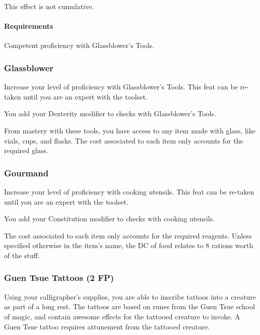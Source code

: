     This effect is not cumulative.
    \paragraph{Requirements} Competent proficiency with Glassblower's Tools.
\subsubsection{Glassblower} \label{feat::glassblower}
    Increase your level of proficiency with Glassblower's Tools.
    This feat can be re-taken until you are an expert with the toolset.

    You add your Dexterity modifier to checks with Glassblower's Tools.

    From mastery with these tools, you have access to any item made with glass, like vials, cups, and flasks.
    The cost associated to each item only accounts for the required glass.

\subsubsection{Gourmand} \label{feat::gourmand}
    Increase your level of proficiency with cooking utensils.
    This feat can be re-taken until you are an expert with the toolset.

    You add your Constitution modifier to checks with cooking utensils.

    The cost associated to each item only accounts for the required reagents.
    Unless specified otherwise in the item's name, the DC of food relates to 8 rations worth of the stuff.
\subsubsection{Guen Tsue Tattoos (2 FP)} \label{feat::guentsuetattoos}
    Using your calligrapher's supplies, you are able to inscribe tattoos into a creature as part of a long rest.
    The tattoos are based on runes from the Guen Tsue school of magic, and contain awesome effects for the tattooed creature to invoke.
    A Guen Tsue tattoo requires attunement from the tattooed creature.

